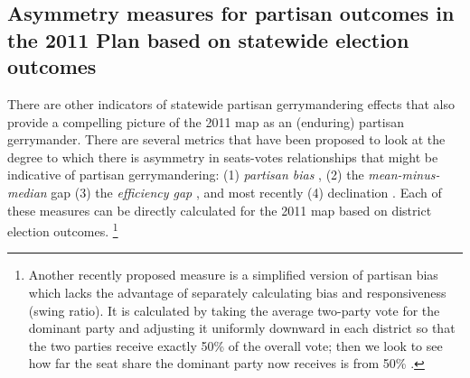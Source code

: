 \subsection*{Asymmetry measures for partisan outcomes in the 2011 Plan based on statewide election outcomes}
%
%
    There are other indicators of statewide partisan gerrymandering effects that also provide a compelling picture of the 2011 map as an (enduring) partisan gerrymander. There are several metrics that have been proposed to look at the degree to which there is asymmetry in seats-votes relationships that might be indicative of partisan gerrymandering: (1) \textit{partisan bias} \citep{Tufte1973}, (2) the \textit{mean-minus-median} gap \citep{Mcdonald_Best_2015_ELJ} (3) the \textit{efficiency gap} \citep{Stephanopoulos2014_UofChicagoLaw}, and most recently (4) declination \citep{Warrington2018}. Each of these measures can be directly calculated for the 2011 map based on district election outcomes. 
    \footnote{Another recently proposed measure is a simplified version of partisan bias which lacks the advantage of separately calculating bias and responsiveness (swing ratio). It is calculated by taking the average two-party vote for the dominant party and adjusting it uniformly downward in each district so that the two parties receive exactly 50\% of the overall vote; then we look to see how far the seat share the dominant party now receives is from 50\% \citep{Wang2016_SLR}.}
\par
